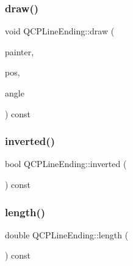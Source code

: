 \mbox{\label{class_q_c_p_line_ending_af7ac30a81ba85b9bded148c6ec387391}} 
\subsubsection{\texorpdfstring{draw()}{draw()}\hspace{0.1cm}{\footnotesize\ttfamily [2/2]}}
{\footnotesize\ttfamily void Q\+C\+P\+Line\+Ending\+::draw (\begin{DoxyParamCaption}\item[{\hyperlink{class_q_c_p_painter}{Q\+C\+P\+Painter} $\ast$}]{painter,  }\item[{const \hyperlink{class_q_c_p_vector2_d}{Q\+C\+P\+Vector2D} \&}]{pos,  }\item[{double}]{angle }\end{DoxyParamCaption}) const}

\mbox{\label{class_q_c_p_line_ending_a15a68706d298a0c9f94556f6b4db15ff}} 
\subsubsection{\texorpdfstring{inverted()}{inverted()}}
{\footnotesize\ttfamily bool Q\+C\+P\+Line\+Ending\+::inverted (\begin{DoxyParamCaption}{ }\end{DoxyParamCaption}) const\hspace{0.3cm}{\ttfamily [inline]}}

\mbox{\label{class_q_c_p_line_ending_aee9050a13fe115bd1b6794f9ad14cd72}} 
\subsubsection{\texorpdfstring{length()}{length()}}
{\footnotesize\ttfamily double Q\+C\+P\+Line\+Ending\+::length (\begin{DoxyParamCaption}{ }\end{DoxyParamCaption}) const\hspace{0.3cm}{\ttfamily [inline]}}

